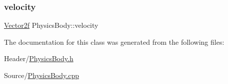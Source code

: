 \mbox{\label{class_physics_body_a8a2c10fcb6da06fc46270a570b1fadf7}} 
\subsubsection{\texorpdfstring{velocity}{velocity}}
{\footnotesize\ttfamily \mbox{\hyperlink{class_vector2f}{Vector2f}} Physics\+Body\+::velocity}



The documentation for this class was generated from the following files\+:\begin{DoxyCompactItemize}
\item 
Header/\mbox{\hyperlink{_physics_body_8h}{Physics\+Body.\+h}}\item 
Source/\mbox{\hyperlink{_physics_body_8cpp}{Physics\+Body.\+cpp}}\end{DoxyCompactItemize}
